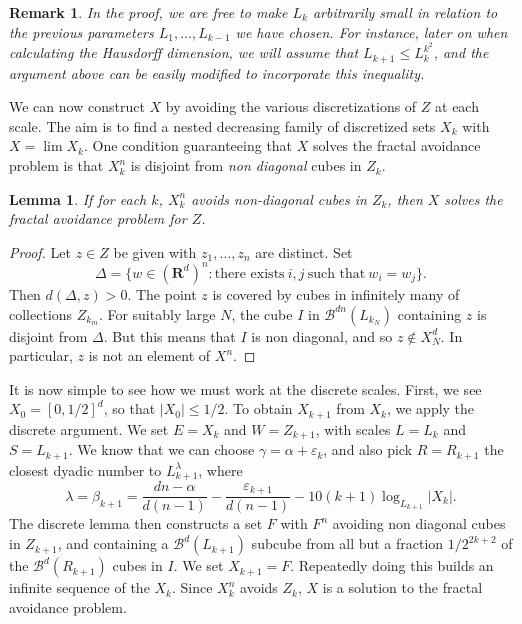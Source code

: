 \documentclass[usenames,dvipsnames]{article}
\theoremstyle{plain}
\newtheorem{lemma}{Lemma}
\theoremstyle{plain}
\newtheorem*{remark}{Remark}
\begin{document}
\begin{remark}
	In the proof, we are free to make $L_k$ arbitrarily small in relation to the previous parameters $L_1, \dots, L_{k-1}$ we have chosen. For instance, later on when calculating the Hausdorff dimension, we will assume that $L_{k+1} \leq L_k^{k^2}$, and the argument above can be easily modified to incorporate this inequality.
\end{remark}

We can now construct $X$ by avoiding the various discretizations of $Z$ at each scale. The aim is to find a nested decreasing family of discretized sets $X_k$ with $X = \lim X_k$. One condition guaranteeing that $X$ solves the fractal avoidance problem is that $X_k^n$ is disjoint from {\it non diagonal} cubes in $Z_k$.

\begin{lemma}
	If for each $k$, $X_k^n$ avoids non-diagonal cubes in $Z_k$, then $X$ solves the fractal avoidance problem for $Z$.
\end{lemma}
\begin{proof}
	Let $z \in Z$ be given with $z_1, \dots, z_n$ are distinct. Set
	\[ \Delta = \{ w \in (\mathbf{R}^d)^n : \text{there exists}\ i,j\ \text{such that}\ w_i = w_j \}. \]
	Then $d(\Delta,z) > 0$. The point $z$ is covered by cubes in infinitely many of collections $Z_{k_m}$. For suitably large $N$, the cube $I$ in $\mathcal{B}^{dn}(L_{k_N})$ containing $z$ is disjoint from $\Delta$. But this means that $I$ is non diagonal, and so $z \not \in X_N^d$. In particular, $z$ is not an element of $X^n$.
\end{proof}

It is now simple to see how we must work at the discrete scales. First, we see $X_0 = [0,1/2]^d$, so that $|X_0| \leq 1/2$. To obtain $X_{k+1}$ from $X_k$, we apply the discrete argument. We set $E = X_k$ and $W = Z_{k+1}$, with scales $L = L_k$ and $S = L_{k+1}$. We know that we can choose $\gamma = \alpha + \varepsilon_k$, and also pick $R = R_{k+1}$ the closest dyadic number to $L_{k+1}^\lambda$, where
%
\[ \lambda = \beta_{k+1} = \frac{dn - \alpha}{d(n-1)} - \frac{\varepsilon_{k+1}}{d(n-1)} - 10(k+1) \log_{L_{k+1}} |X_k|. \]
%
The discrete lemma then constructs a set $F$ with $F^n$ avoiding non diagonal cubes in $Z_{k+1}$, and containing a $\mathcal{B}^d(L_{k+1})$ subcube from all but a fraction $1/2^{2k +2}$ of the $\mathcal{B}^d(R_{k+1})$ cubes in $I$. We set $X_{k+1} = F$. Repeatedly doing this builds an infinite sequence of the $X_k$. Since $X_k^n$ avoids $Z_k$, $X$ is a solution to the fractal avoidance problem.
\end{document}
